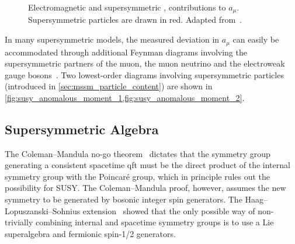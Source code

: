 \begin{figure}
\begin{subfigure}[b]{0.33\linewidth}
		\caption{\label{fig:susy_anomalous_moment_2}}
	\end{subfigure}	
	\caption{Electromagnetic  and supersymmetric ,  contributions to $a_\mu$. Supersymmetric particles are drawn in red. Adapted from~\cite{baer_tata_2006}.}\label{fig:loop_corrections_anomalous_moment}
\end{figure}

In many supersymmetric models, the measured deviation in $a_\mu$ can easily be accommodated through additional Feynman diagrams involving the supersymmetric partners of the muon, the muon neutrino and the electroweak gauge bosons~\cite{Czarnecki:2001pv,Feng:2001tr}. Two lowest-order diagrams involving supersymmetric particles (introduced in \cref{sec:mssm_particle_content}) are shown in \cref{fig:susy_anomalous_moment_1,fig:susy_anomalous_moment_2}.


\subsection{Supersymmetric Algebra}\label{sec:susy_algebra}

The Coleman--Mandula no-go theorem~\cite{PhysRev.159.1251} dictates that the symmetry group generating a consistent spacetime \gls{qft} must be the direct product of the internal symmetry group with the Poincaré group, which in principle rules out the possibility for SUSY. The Coleman--Mandula proof, however, assumes the new symmetry to be generated by bosonic integer spin generators. The Haag--Lopuszanski--Sohnius extension~\cite{Haag:1974qh} showed that the only possible way of non-trivially combining internal and spacetime symmetry groups is to use a Lie superalgebra and fermionic spin-1/2 generators.

